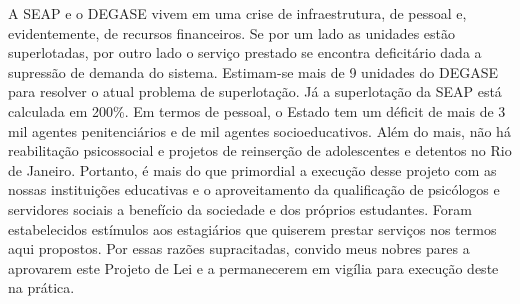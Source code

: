 \documentclass[10pt]{article}
\begin{document}
  	A SEAP e o DEGASE vivem em uma crise de infraestrutura, de pessoal e, evidentemente, de recursos financeiros. Se por um lado as unidades estão superlotadas, por outro lado o serviço prestado se encontra deficitário dada a supressão de demanda do sistema. Estimam-se mais de 9 unidades do DEGASE para resolver o atual problema de superlotação. Já a superlotação da SEAP está calculada em 200\%.
	Em termos de pessoal, o Estado tem um déficit de mais de 3 mil agentes penitenciários e de mil agentes socioeducativos. Além do mais, não há reabilitação psicossocial e projetos de reinserção de adolescentes e detentos no Rio de Janeiro. Portanto, é mais do que primordial a execução desse projeto com as nossas instituições educativas e o aproveitamento da qualificação de psicólogos e servidores sociais a benefício da sociedade e dos próprios estudantes.
	Foram estabelecidos estímulos aos estagiários que quiserem prestar serviços nos termos aqui propostos.
	Por essas razões supracitadas, convido meus nobres pares a aprovarem este Projeto de Lei e a permanecerem em vigília para execução deste na prática.



\iffalse
\begin{center}
  \textbf{REFERÊNCIAS}
\end{center}


\fi
\end{document}
